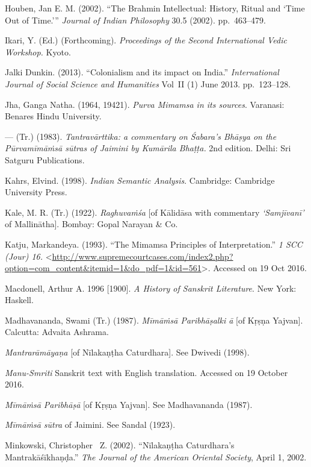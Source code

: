 \begin{thebibliography}{99}
  Houben, Jan E. M. (2002). “The Brahmin Intellectual: History, Ritual and ‘Time Out of Time.’” \textit{Journal of Indian Philosophy} 30.5 (2002). pp.~463--479.

  Ikari, Y. (Ed.) (Forthcoming). \textit{Proceedings of the Second International Vedic Workshop.} Kyoto.

  Jalki Dunkin. (2013). “Colonialism and its impact on India.” \textit{International Journal of Social Science and Humanities} Vol~II (1) June 2013. pp.~123--128.

  Jha, Ganga Natha. (1964, 19421). \textit{Purva Mimamsa in its sources}. Varanasi: Benares Hindu University.

  --- (Tr.) (1983). \textit{Tantravārttika: a commentary on Śabara's Bhāṣya on the Pūrvamīmāṁsā sūtras of Jaimini by Kumārila Bhaṭṭa.} 2nd edition. Delhi: Sri Satguru Publications.

  Kahrs, Elvind. (1998). \textit{Indian Semantic Analysis}. Cambridge: Cambridge University Press.

  Kale, M. R. (Tr.) (1922). \textit{Raghuvaṁśa} [of Kālidāsa with commentary \textit{‘Samjīvanī’} of Mallinātha]. Bombay: Gopal Narayan \& Co.

  Katju, Markandeya. (1993). “The Mimamsa Principles of Interpretation.” \textit{1 SCC (Jour) 16.} \textless \url{http://www.supremecourtcases.com/index2.php?option=com_content&itemid=1&do_pdf=1&id=561}\textgreater. Accessed on 19 Oct 2016.

  Macdonell, Arthur A. 1996 [1900]. \textit{A History of Sanskrit Literature}. New York: Haskell.  

  Madhavananda, Swami (Tr.) (1987). \textit{Mīmāṁsā Paribhāṣalki ā} [of Kṛṣṇa Yajvan]. Calcutta: Advaita Ashrama.

  \textit{Mantrarāmāyaṇa} [of Nīlakaṇṭha Caturdhara]. See Dwivedi (1998).

  \textit{Manu-Smriti} Sanskrit text with English translation. Accessed on 19 October 2016.

  \textit{Mīmāṁsā Paribhāṣā} [of Kṛṣṇa Yajvan]. See Madhavananda (1987).

  \textit{Mīmāṁsā sūtra} of Jaimini. See Sandal (1923).

  Minkowski, Christopher  Z. (2002). “Nīlakaṇṭha Caturdhara's Mantrakāśīkhaṇḍa.” \textit{The Journal of the American Oriental Society}, April 1, 2002.


\end{thebibliography}
